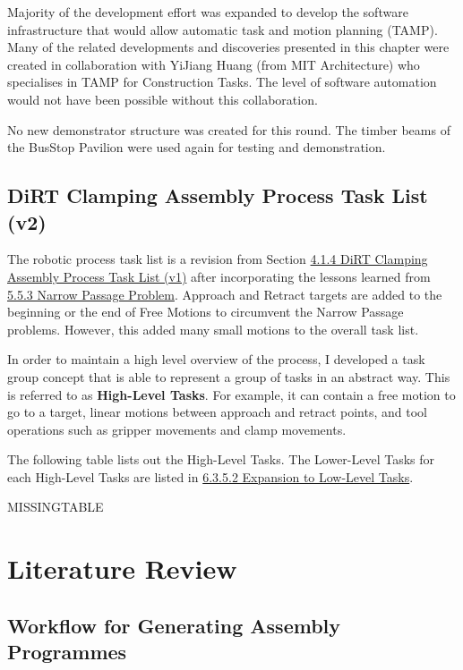 Majority of the development effort was expanded to develop the software infrastructure that would allow automatic task and motion planning (TAMP). Many of the related developments and discoveries presented in this chapter were created in collaboration with YiJiang Huang (from MIT Architecture) who specialises in TAMP for Construction Tasks. The level of software automation would not have been possible without this collaboration.

No new demonstrator structure was created for this round. The timber beams of the BusStop Pavilion were used again for testing and demonstration. 

\subsection{DiRT Clamping Assembly Process Task List (v2)}
\label{subsection:exploration_3_dirt_clamping_assembly_process_task_list_v2}

The robotic process task list is a revision from Section \ul{4.1.4 DiRT Clamping Assembly Process Task List (v1)} after incorporating the lessons learned from \ul{5.5.3 Narrow Passage Problem}. Approach and Retract targets are added to the beginning or the end of Free Motions to circumvent the Narrow Passage problems. However, this added many small motions to the overall task list.

In order to maintain a high level overview of the process, I developed a task group concept that is able to represent a group of tasks in an abstract way. This is referred to as \textbf{High-Level Tasks}. For example, it can contain a free motion to go to a target, linear motions between approach and retract points, and tool operations such as gripper movements and clamp movements. 

The following table lists out the High-Level Tasks. The Lower-Level Tasks for each High-Level Tasks are listed in \ul{6.3.5.2 Expansion to Low-Level Tasks}. 

MISSINGTABLE

\section{Literature Review}
\label{section:exploration_3_literature_review}

\subsection{Workflow for Generating Assembly Programmes}
\label{subsection:exploration_3_workflow_for_generating_assembly_programmes}

